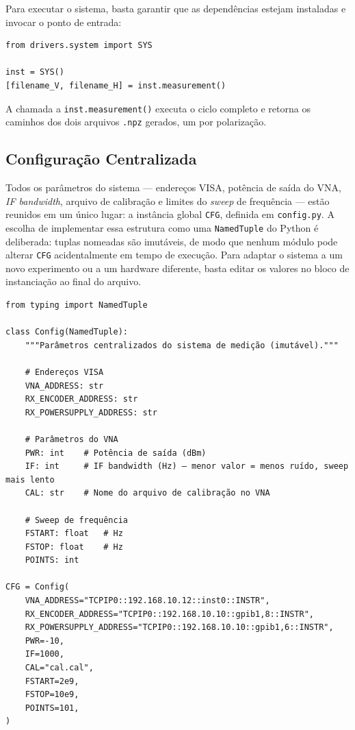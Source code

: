 \documentclass[12pt, a4paper]{article}
\begin{document}
Para executar o sistema, basta garantir que as dependências estejam instaladas e invocar o ponto de entrada:

\begin{lstlisting}[style=python, caption={Ponto de entrada do sistema (\texttt{main.py}).}]
from drivers.system import SYS

inst = SYS()
[filename_V, filename_H] = inst.measurement()
\end{lstlisting}

A chamada a \texttt{inst.measurement()} executa o ciclo completo e retorna os caminhos dos dois arquivos \texttt{.npz} gerados, um por polarização.

\subsection{Configuração Centralizada}

Todos os parâmetros do sistema --- endereços VISA, potência de saída do VNA, \textit{IF bandwidth}, arquivo de calibração e limites do \textit{sweep} de frequência --- estão reunidos em um único lugar: a instância global \texttt{CFG}, definida em \texttt{config.py}. A escolha de implementar essa estrutura como uma \texttt{NamedTuple} do Python é deliberada: tuplas nomeadas são imutáveis, de modo que nenhum módulo pode alterar \texttt{CFG} acidentalmente em tempo de execução. Para adaptar o sistema a um novo experimento ou a um hardware diferente, basta editar os valores no bloco de instanciação ao final do arquivo.

\begin{lstlisting}[style=python, caption={Definição da estrutura de configuração (\texttt{config.py}).}]
from typing import NamedTuple

class Config(NamedTuple):
    """Parâmetros centralizados do sistema de medição (imutável)."""

    # Endereços VISA
    VNA_ADDRESS: str
    RX_ENCODER_ADDRESS: str
    RX_POWERSUPPLY_ADDRESS: str

    # Parâmetros do VNA
    PWR: int    # Potência de saída (dBm)
    IF: int     # IF bandwidth (Hz) — menor valor = menos ruído, sweep mais lento
    CAL: str    # Nome do arquivo de calibração no VNA

    # Sweep de frequência
    FSTART: float   # Hz
    FSTOP: float    # Hz
    POINTS: int

CFG = Config(
    VNA_ADDRESS="TCPIP0::192.168.10.12::inst0::INSTR",
    RX_ENCODER_ADDRESS="TCPIP0::192.168.10.10::gpib1,8::INSTR",
    RX_POWERSUPPLY_ADDRESS="TCPIP0::192.168.10.10::gpib1,6::INSTR",
    PWR=-10,
    IF=1000,
    CAL="cal.cal",
    FSTART=2e9,
    FSTOP=10e9,
    POINTS=101,
)
\end{lstlisting}
\end{document}
